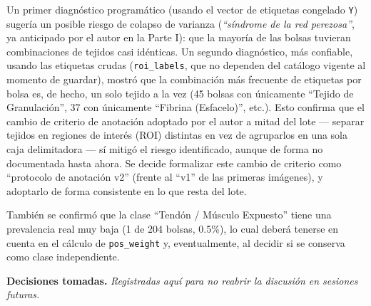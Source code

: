 \documentclass[12pt,letterpaper]{report}
\newcommand{\entrada}[2]{%
    \vspace{0.6em}
    \noindent\textbf{#1.} \textit{#2}
    \vspace{0.3em}
    \par
}
\begin{document}
Un primer diagnóstico programático (usando el vector de etiquetas congelado \texttt{Y}) sugería
un posible riesgo de colapso de varianza (\emph{``síndrome de la red perezosa''}, ya anticipado
por el autor en la Parte I): que la mayoría de las bolsas tuvieran combinaciones de tejidos casi
idénticas. Un segundo diagnóstico, más confiable, usando las etiquetas crudas
(\texttt{roi\_labels}, que no dependen del catálogo vigente al momento de guardar), mostró que la
combinación más frecuente de etiquetas por bolsa es, de hecho, un solo tejido a la vez (45 bolsas
con únicamente ``Tejido de Granulación'', 37 con únicamente ``Fibrina (Esfacelo)'', etc.). Esto
confirma que el cambio de criterio de anotación adoptado por el autor a mitad del lote --- separar
tejidos en regiones de interés (ROI) distintas en vez de agruparlos en una sola caja delimitadora
--- sí mitigó el riesgo identificado, aunque de forma no documentada hasta ahora. Se decide
formalizar este cambio de criterio como ``protocolo de anotación v2'' (frente al ``v1'' de las
primeras imágenes), y adoptarlo de forma consistente en lo que resta del lote.

También se confirmó que la clase ``Tendón / Músculo Expuesto'' tiene una prevalencia real muy baja
(1 de 204 bolsas, 0.5\%), lo cual deberá tenerse en cuenta en el cálculo de \texttt{pos\_weight} y,
eventualmente, al decidir si se conserva como clase independiente.

\entrada{Decisiones tomadas}{Registradas aquí para no reabrir la discusión en sesiones futuras.}
\end{document}
